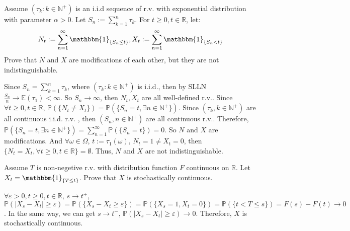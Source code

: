 \documentclass{ctexart}
\begin{document}
\begin{problem}\label{pro:4}
	Assume \((\tau_k:k \in \mathbb{N}^+)\) is an i.i.d sequence of r.v. with exponential distribution with parameter \(\alpha>0\).
	Let \(S_n:=\sum_{k=1}^{n}\tau_k\). For \(t \geq 0,t \in \mathbb{R}\), let:
	\[
		N_t:=\sum_{n=1}^{\infty}\mathbbm{1}_{\{S_n \leq t\}},
		X_t:=\sum_{n=1}^{\infty}\mathbbm{1}_{\{S_n < t\}}
	\]
	Prove that \(N\) and \(X\) are modifications of each other, but they are not indistinguishable.
\end{problem}
\begin{solution}
	Since \(S_n = \sum_{k = 1}^n \tau_k\), where \((\tau_k: k \in \mathbb{N}^+)\) is i.i.d.,
	then by SLLN \(\frac{S_n}{n} \to \mathbb{E}(\tau_1) < \infty\).
	So \(S_n \to \infty\), then \(N_t, X_t\) are all well-defined r.v..
	Since \(\forall t \geq 0, t \in \mathbb{R}\), \(\mathbb{P}(\{N_t \neq X_t\}) = \mathbb{P}(\{S_n = t, \exists n \in \mathbb{N}^+\})\).
	Since \((\tau_k, k \in \mathbb{N}^+)\) are all continuous i.i.d. r.v. , then
	\((S_n, n \in \mathbb{N}^+)\) are all continuous r.v..
	Therefore, \(\mathbb{P}(\{S_n=t, \exists n \in \mathbb{N}^+\}) = \sum_{n = 1}^{\infty} \mathbb{P}(\{S_n = t\})=0\).
	So \(N\) and \(X\) are modifications.
	And \(\forall \omega \in \Omega\), \(t:= \tau_1(\omega)\), \(N_t = 1 \neq X_t = 0\),
	then \(\{N_t = X_t, \forall t \geq 0, t \in \mathbb{R}\} = \emptyset\).
	Thus, \(N\) and \(X\) are not indistinguishable.
\end{solution}

\begin{problem}\label{pro:5}
	Assume \(T\) is non-negetive r.v. with distribution function \(F\) continuous on \(\mathbb{R}\).
	Let \(X_t=\mathbbm{1}_{\{T \leq t\}}\).
	Prove that \(X\) is stochastically continuous.
\end{problem}
\begin{solution}
	\(\forall \varepsilon > 0, t \geq 0, t \in \mathbb{R}\), \(s \to t^+\), \(\mathbb{P}(|X_s-X_t| \geq \varepsilon)= \mathbb{P}(\{X_s-X_t \geq \varepsilon\})= \mathbb{P}(\{X_s = 1, X_t =0\}) = \mathbb{P}(\{t < T \leq s\})= F(s)-F(t) \to 0\).
	In the same way, we can get \(s \to t^-\), \(\mathbb{P}(|X_s-X_t| \geq \varepsilon) \to 0\).
	Therefore, \(X\) is stochastically continuous.
\end{solution}
\end{document}
